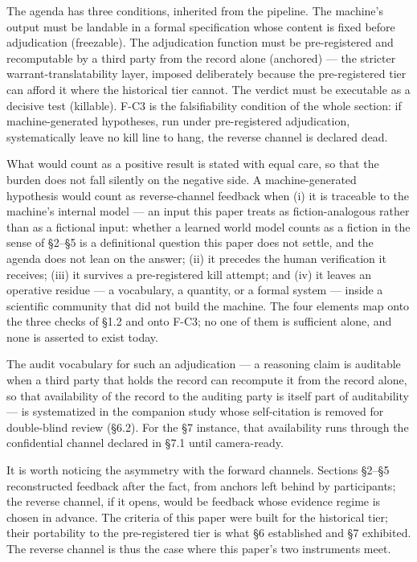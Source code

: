\documentclass[11pt,a4paper]{article}
\begin{document}
The agenda has three conditions, inherited from the pipeline. The machine's output must be landable in a formal specification whose content is fixed before adjudication (freezable). The adjudication function must be pre-registered and recomputable by a third party from the record alone (anchored) — the stricter warrant-translatability layer, imposed deliberately because the pre-registered tier can afford it where the historical tier cannot. The verdict must be executable as a decisive test (killable). F-C3 is the falsifiability condition of the whole section: if machine-generated hypotheses, run under pre-registered adjudication, systematically leave no kill line to hang, the reverse channel is declared dead.

What would count as a positive result is stated with equal care, so that the burden does not fall silently on the negative side. A machine-generated hypothesis would count as reverse-channel feedback when (i) it is traceable to the machine's internal model — an input this paper treats as fiction-analogous rather than as a fictional input: whether a learned world model counts as a fiction in the sense of §2–§5 is a definitional question this paper does not settle, and the agenda does not lean on the answer; (ii) it precedes the human verification it receives; (iii) it survives a pre-registered kill attempt; and (iv) it leaves an operative residue — a vocabulary, a quantity, or a formal system — inside a scientific community that did not build the machine. The four elements map onto the three checks of §1.2 and onto F-C3; no one of them is sufficient alone, and none is asserted to exist today.

The audit vocabulary for such an adjudication — a reasoning claim is auditable when a third party that holds the record can recompute it from the record alone, so that availability of the record to the auditing party is itself part of auditability — is systematized in the companion study whose self-citation is removed for double-blind review (§6.2). For the §7 instance, that availability runs through the confidential channel declared in §7.1 until camera-ready.

It is worth noticing the asymmetry with the forward channels. Sections §2–§5 reconstructed feedback after the fact, from anchors left behind by participants; the reverse channel, if it opens, would be feedback whose evidence regime is chosen in advance. The criteria of this paper were built for the historical tier; their portability to the pre-registered tier is what §6 established and §7 exhibited. The reverse channel is thus the case where this paper's two instruments meet.
\end{document}
